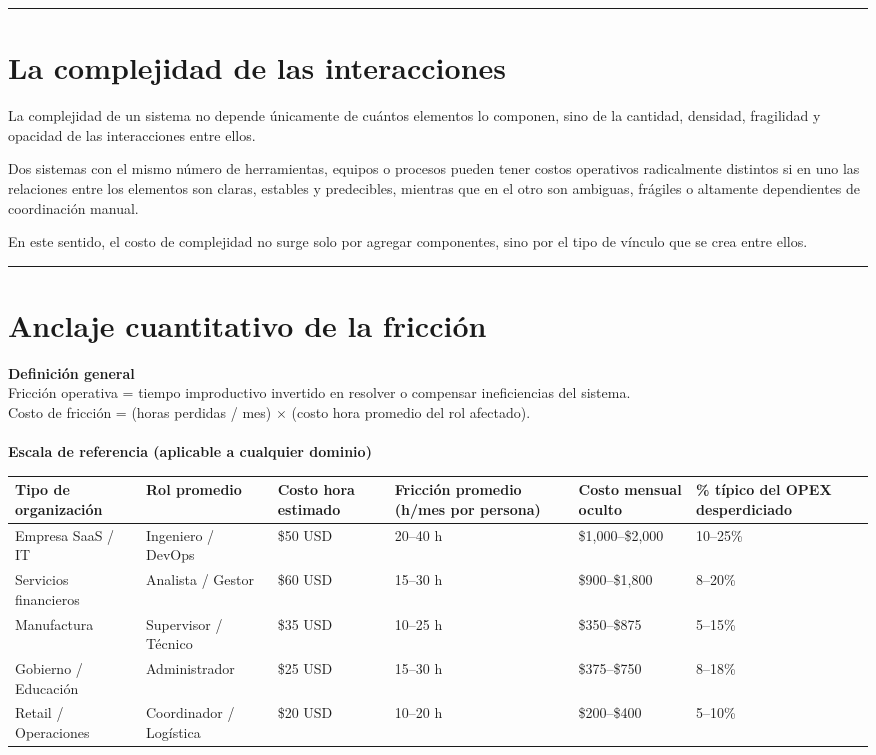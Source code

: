 \hrule
\section{La complejidad de las interacciones}

La complejidad de un sistema no depende únicamente de cuántos elementos lo componen, sino de la cantidad, densidad, fragilidad y opacidad de las interacciones entre ellos.

Dos sistemas con el mismo número de herramientas, equipos o procesos pueden tener costos operativos radicalmente distintos si en uno las relaciones entre los elementos son claras, estables y predecibles, mientras que en el otro son ambiguas, frágiles o altamente dependientes de coordinación manual.

En este sentido, el costo de complejidad no surge solo por agregar componentes, sino por el tipo de vínculo que se crea entre ellos.


\newpage
\hrule


\section{Anclaje cuantitativo de la fricción}\label{sec:anclaje}

{\textbf{Definición general}}\\
Fricción operativa = tiempo improductivo invertido en resolver o compensar ineficiencias del sistema.\\
Costo de fricción = (horas perdidas / mes) $\times$ (costo hora promedio del rol afectado).
\\
\\
{\textbf{Escala de referencia (aplicable a cualquier dominio)}}
\\
\begin{table}[h]
\centering
\small
\begin{tabular}{|p{3cm}|p{2.5cm}|p{2cm}|p{2.5cm}|p{2cm}|p{2cm}|}
\hline
\textbf{Tipo de organización} & \textbf{Rol promedio} & \textbf{Costo hora estimado} & \textbf{Fricción promedio (h/mes por persona)} & \textbf{Costo mensual oculto} & \textbf{\% típico del OPEX desperdiciado} \\ \hline
Empresa SaaS / IT & Ingeniero / DevOps & \$50 USD & 20--40 h & \$1,000--\$2,000 & 10--25\% \\ \hline
Servicios financieros & Analista / Gestor & \$60 USD & 15--30 h & \$900--\$1,800 & 8--20\% \\ \hline
Manufactura & Supervisor / Técnico & \$35 USD & 10--25 h & \$350--\$875 & 5--15\% \\ \hline
Gobierno / Educación & Administrador & \$25 USD & 15--30 h & \$375--\$750 & 8--18\% \\ \hline
Retail / Operaciones & Coordinador / Logística & \$20 USD & 10--20 h & \$200--\$400 & 5--10\% \\ \hline
\end{tabular}
\end{table}

